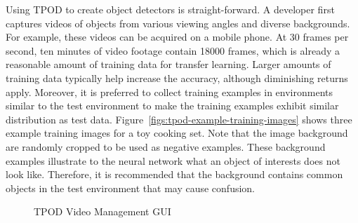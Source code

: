 Using TPOD to create object detectors is straight-forward. A developer first
captures videos of objects from various viewing angles and diverse backgrounds.
For example, these videos can be acquired on a mobile phone. At 30 frames per
second, ten minutes of video footage contain 18000 frames, which is already a
reasonable amount of training data for transfer learning. Larger amounts of
training data typically help increase the accuracy, although diminishing returns
apply. Moreover, it is preferred to collect training examples in environments
similar to the test environment to make the training examples exhibit similar
distribution as test data. Figure~\ref{figs:tpod-example-training-images} shows
three example training images for a toy cooking set. Note that the image
background are randomly cropped to be used as negative examples. These
background examples illustrate to the neural network what an object of interests
does not look like. Therefore, it is recommended that the background contains
common objects in the test environment that may cause confusion.


\begin{figure}[]
  \centering
    \caption{TPOD Video Management GUI}
  \label{figs:tpod-video-gui}
\end{figure}

